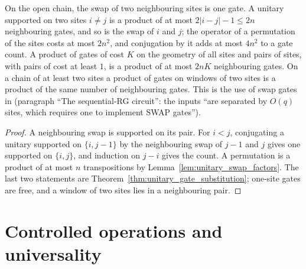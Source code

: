 \begin{theorem}
    \label{thm:unitary_swap_routing}
    \leanok
    On the open chain, the swap of two neighbouring sites is one gate. A unitary supported
    on two sites $i\ne j$ is a product of at most $2|i-j|-1\le2n$ neighbouring gates, and so
    is the swap of $i$ and $j$; the operator of a permutation of the sites costs at most
    $2n^2$, and conjugation by it adds at most $4n^2$ to a gate count. A product of gates of
    cost $K$ on the geometry of all sites and pairs of sites, with pairs of cost at least
    $1$, is a product of at most $2nK$ neighbouring gates. On a chain of at least two sites a
    product of gates on windows of two sites is a product of the same number of neighbouring
    gates. This is the use of swap gates in \cite{Malz2024Preparation} (paragraph ``The
    sequential-RG circuit'': the inputs ``are separated by $O(q)$ sites, which requires one to
    implement SWAP gates'').
\end{theorem}
\begin{proof}\leanok
    A neighbouring swap is supported on its pair. For $i<j$, conjugating a unitary supported
    on $\{i,j-1\}$ by the neighbouring swap of $j-1$ and $j$ gives one supported on
    $\{i,j\}$, and induction on $j-i$ gives the count. A permutation is a product of at most
    $n$ transpositions by Lemma~\ref{lem:unitary_swap_factors}. The last two statements are
    Theorem~\ref{thm:unitary_gate_substitution}; one-site gates are free, and a window of two
    sites lies in a neighbouring pair.
\end{proof}

\section{Controlled operations and universality}
\label{sec:unitary_universality}

